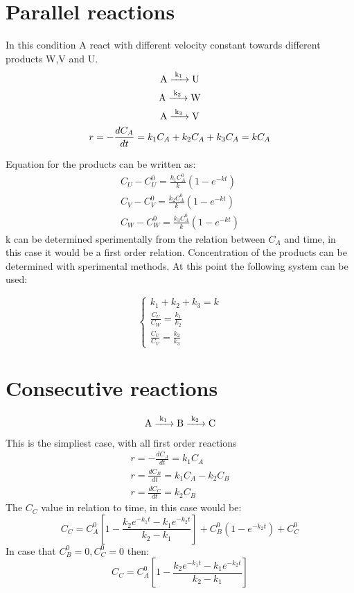 \documentclass[../Master.tex]{subfiles}
\begin{document}
\begin{multicols}{2}
		 \section{Parallel reactions}
		  In this condition A react with different velocity constant towards different
		  products W,V and U.
		  \begin{gather*}
				   \ce{ A ->[{k_{1}}] U} \\
				   \ce{ A ->[{k_{2}}] W} \\
				   \ce{ A ->[{k_{3}}] V} \\
				   r =  - \frac{dC_{A} }{dt} = k_{1}C_{A} + k_{2}C_{A} + k_{3}C_{A} = kC_{A}
		  \end{gather*}

		  Equation for the products can be written as:
		  \begin{gather*}
				   C_{U} - C_{U}^{0} = \frac{k_{1}C_{A}^{0}}{k}(1-e^{-kt})\\
				   C_{V} - C_{V}^{0} = \frac{k_{2}C_{A}^{0}}{k}(1-e^{-kt})\\
				   C_{W} - C_{W}^{0} = \frac{k_{3}C_{A}^{0}}{k}(1-e^{-kt})
		  \end{gather*}
		  k can be determined sperimentally from the relation between \( C_{A}  \) and time, in this case it would be a first order relation.
		  Concentration of the products can be determined with sperimental methods. At this point the following system can be used:

		  \begin{equation*}
				   \begin{cases}
						    k_{1} + k_{2} + k_{3} = k                  \\
						    \frac{C_{U}}{C_{W} } = \frac{k_{1}}{k_{2}} \\
						    \frac{C_{U} }{C_{V}} = \frac{k_{2}}{k_{3}}
				   \end{cases}
		  \end{equation*}

		 \section{Consecutive reactions}
		  \begin{gather*}
				   \ce{ A ->[{k_{1}}] B ->[{k_{2}}]C}\\
		  \end{gather*}
		  This is the simpliest case, with all first order reactions
		  \begin{gather*}
				   r = -\frac{dC_{A}}{dt} = k_{1}C_{A}\\
				   r = \frac{dC_{B}}{dt} = k_{1}C_{A} - k_{2}C_{B}\\
				   r = \frac{dC_{C}}{dt} = k_{2}C_{B}
		  \end{gather*}
		  The $C_{C}$ value in relation to time, in this case would be:
		  \[
				   C_{C} = C_{A}^{0}\left[1 -\frac{k_{2}e^{-k_{1}t} -k_{1}e^{-k_{2}t}}{k_{2}-k_{1}} \right] + C_{B}^{0}(1-e^{-k_{2}t})+C_{C}^{0}
		  \]
		  In case that \( C_{B}^0=0, C_{C}^0 = 0 \) then:
		  \[
				   C_{C} = C_{A}^{0}\left[1 -\frac{k_{2}e^{-k_{1}t} -k_{1}e^{-k_{2}t}}{k_{2}-k_{1}} \right]
		  \]

\end{multicols}
\end{document}
